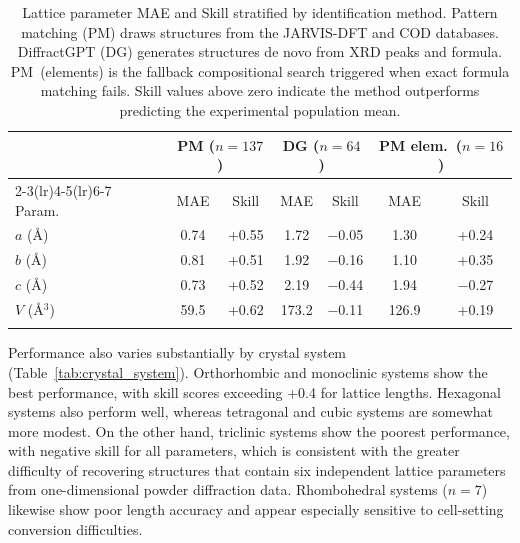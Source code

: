 \documentclass[pdflatex,sn-mathphys-num]{sn-jnl}
\theoremstyle{thmstyleone}
\theoremstyle{thmstyletwo}
\theoremstyle{thmstylethree}
\begin{document}
\begin{table}[h]
\caption{Lattice parameter MAE and Skill stratified by identification method. Pattern matching (PM) draws structures from the JARVIS-DFT and COD databases. DiffractGPT (DG) generates structures de novo from XRD peaks and formula. PM~(elements) is the fallback compositional search triggered when exact formula matching fails. Skill values above zero indicate the method outperforms predicting the experimental population mean.}\label{tab:method_breakdown}
\begin{tabular}{@{}lcccccc@{}}
\toprule
& \multicolumn{2}{c}{PM ($n=137$)} & \multicolumn{2}{c}{DG ($n=64$)} & \multicolumn{2}{c}{PM elem.\ ($n=16$)} \\
\cmidrule(lr){2-3}\cmidrule(lr){4-5}\cmidrule(lr){6-7}
Param.\ & MAE & Skill & MAE & Skill & MAE & Skill \\
\midrule
$a$ (\AA) & 0.74 & +0.55 & 1.72 & $-$0.05 & 1.30 & +0.24 \\
$b$ (\AA) & 0.81 & +0.51 & 1.92 & $-$0.16 & 1.10 & +0.35 \\
$c$ (\AA) & 0.73 & +0.52 & 2.19 & $-$0.44 & 1.94 & $-$0.27 \\
$V$ (\AA$^3$) & 59.5 & +0.62 & 173.2 & $-$0.11 & 126.9 & +0.19 \\
\botrule
\end{tabular}
\end{table}

Performance also varies substantially by crystal system (Table~\ref{tab:crystal_system}). Orthorhombic and monoclinic systems show the best performance, with skill scores exceeding +0.4 for lattice lengths. Hexagonal systems also perform well, whereas tetragonal and cubic systems are somewhat more modest. On the other hand, triclinic systems show the poorest performance, with negative skill for all parameters, which is consistent with the greater difficulty of recovering structures that contain six independent lattice parameters from one-dimensional powder diffraction data. Rhombohedral systems ($n = 7$) likewise show poor length accuracy and appear especially sensitive to cell-setting conversion difficulties.
\end{document}
